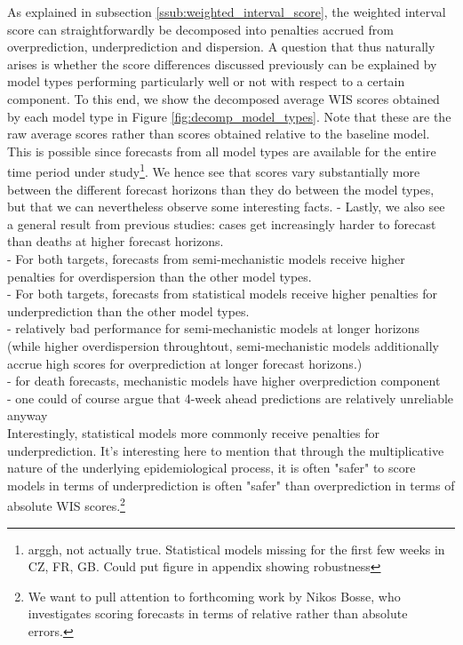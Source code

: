 As explained in subsection \ref{ssub:weighted_interval_score}, the weighted interval score can straightforwardly be decomposed into penalties accrued from overprediction, underprediction and dispersion. A question that thus naturally arises is whether the score differences discussed previously can be explained by model types performing particularly well or not with respect to a certain component. To this end, we show the decomposed average WIS scores obtained by each model type in Figure \ref{fig:decomp_model_types}. Note that these are the raw average scores rather than scores obtained relative to the baseline model. This is possible since forecasts from all model types are available for the entire time period under study\footnote{arggh, not actually true. Statistical models missing for the first few weeks in CZ, FR, GB. Could put figure in appendix showing robustness}. We hence see that scores vary substantially more between the different forecast horizons than they do between the model types, but that we can nevertheless observe some interesting facts. 
- Lastly, we also see a general result from previous studies: cases get increasingly harder to forecast than deaths at higher forecast horizons.\\
- For both targets, forecasts from semi-mechanistic models receive higher penalties for overdispersion than the other model types.\\
- For both targets, forecasts from statistical models receive higher penalties for underprediction than the other model types.\\
- relatively bad performance for semi-mechanistic models at longer horizons (while higher overdispersion throughtout, semi-mechanistic models additionally accrue high scores for overprediction at longer forecast horizons.)\\
- for death forecasts, mechanistic models have higher overprediction component\\
- one could of course argue that 4-week ahead predictions are relatively unreliable anyway \\
Interestingly, statistical models more commonly receive penalties for underprediction. It's interesting here to mention that through the multiplicative nature of the underlying epidemiological process, it is often "safer" to score models in terms of underprediction is often "safer" than overprediction in terms of absolute WIS scores.\footnote{We want to pull attention to forthcoming work by Nikos Bosse, who investigates scoring forecasts in terms of relative rather than absolute errors.}  \\
